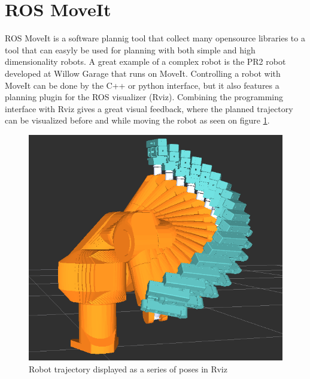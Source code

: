 \section{ROS MoveIt}
\label{sec:moveit}
ROS MoveIt is a software plannig tool that collect many opensource libraries to a tool that can easyly be used for planning with both simple and high dimensionality robots. A great example of a complex robot is the PR2 robot developed at Willow Garage that runs on MoveIt.
Controlling a robot with MoveIt can be done by the C++ or python interface, but it also features a planning plugin for the ROS visualizer (Rviz). Combining the programming interface with Rviz gives a great visual feedback, where the planned trajectory can be visualized before and while moving the robot as seen on figure \ref{fig:robot_trajectory}.

\begin{figure}[htb]
	\begin{center}
		\includegraphics[scale=0.5,trim=0 0 0 0]{graphics/05_robotics/robot_trajectory.png}%
		\caption{Robot trajectory displayed as a series of poses in Rviz}
		\label{fig:robot_trajectory}
	\end{center}
\end{figure}

